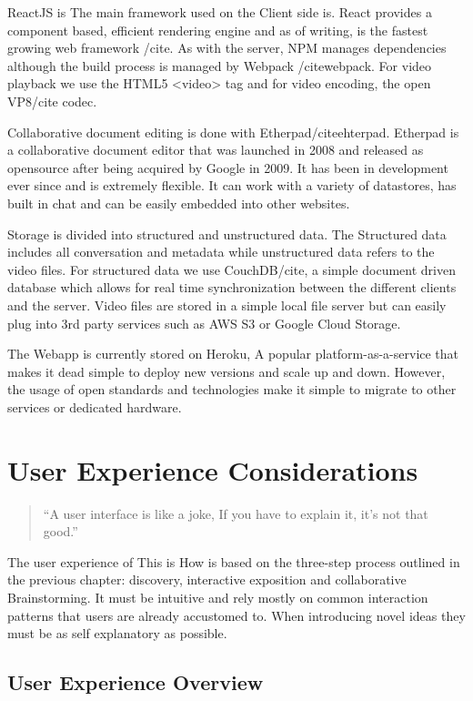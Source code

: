 ReactJS is The main framework used on the Client side is. React provides a component based, efficient rendering engine and as of writing, is the fastest growing web framework /cite{}. As with the server, NPM manages dependencies although the build process is managed by Webpack /cite{webpack}. For video playback we use the HTML5 <video> tag and for video encoding, the open VP8/cite{} codec. 

Collaborative document editing is done with Etherpad/cite{ehterpad}. Etherpad is a collaborative document editor that was launched in 2008 and released as opensource after being acquired by Google in 2009. It has been in development ever since and is extremely flexible. It can work with a variety of datastores, has built in chat and can be easily embedded into other websites.

Storage is divided into structured and unstructured data. The Structured data includes all conversation and metadata while unstructured data refers to the video files. For structured data we use CouchDB/cite{}, a simple document driven database which allows for real time synchronization between the different clients and the server.  Video files are stored in a simple local file server but can easily plug into 3rd party services such as AWS S3 or Google Cloud Storage.

The Webapp is currently stored on Heroku, A popular platform-as-a-service that makes it dead simple to deploy new versions and scale up and down. However, the usage of open standards and technologies make it simple to migrate to other services or dedicated hardware. 


\section{User Experience Considerations} 

\begin{quotation}
``A user interface is like a joke, If you have to explain it, it's not that good.''
\end{quotation}

The user experience of This is How is based on the three-step process outlined in the previous chapter: discovery, interactive exposition and collaborative Brainstorming. It must be intuitive and rely mostly on common interaction patterns that users are already accustomed to. When introducing novel ideas they must be as self explanatory as possible. 

\subsection{User Experience Overview}


